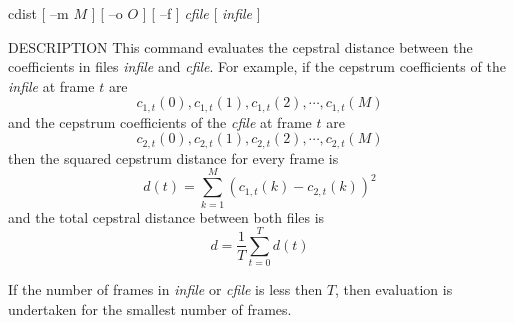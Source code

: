 % 
% 
% 
% 
%                                                                        
%

\begin{synopsis}
\item [cdist] [ --m $M$ ] [ --o $O$ ] [ --f ] {\em cfile}
 	    [ {\em infile} ] 
\end{synopsis}

\begin{qsection}{DESCRIPTION}
This command evaluates the cepstral distance between the coefficients in
 files {\em infile} and {\em cfile}.
For example, if the cepstrum coefficients of the {\em infile} at
frame $t$ are 
\[c_{1,t}(0),c_{1,t}(1),c_{1,t}(2),\cdots,c_{1,t}(M)\]
and the cepstrum coefficients of the {\em cfile} at frame $t$ are
\[c_{2,t}(0),c_{2,t}(1),c_{2,t}(2),\cdots,c_{2,t}(M)\]
then the squared cepstrum distance for every frame is
\[d(t)=\sum_{k=1}^{M} (c_{1,t}(k)-c_{2,t}(k))^2\]
and the total cepstral distance between both files is
\[d=\frac{1}{T} \sum_{t=0}^{T} d(t)\]

If the number of frames in {\em infile} or {\em cfile} is less
then $T$, then evaluation is undertaken for the smallest number of frames.
\end{qsection}

